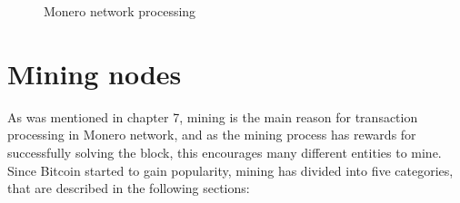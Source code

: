 \documentclass[
  printed, %
  table,   %
  nolof,     %
  nolot,     %
           oneside, color
]{fithesis3}
\begin{document}
\begin{figure}[H]
\caption{Monero network processing}
\label{pict:network-processing}
\end{figure}
\newpage
\section{Mining nodes}
As was mentioned in chapter 7, mining is the main reason for transaction processing in Monero network, and as the mining process has rewards for successfully solving the block, this encourages many different entities to mine.
Since Bitcoin started to gain popularity, mining has divided into five categories, that are described in the following sections:  

\end{document}
